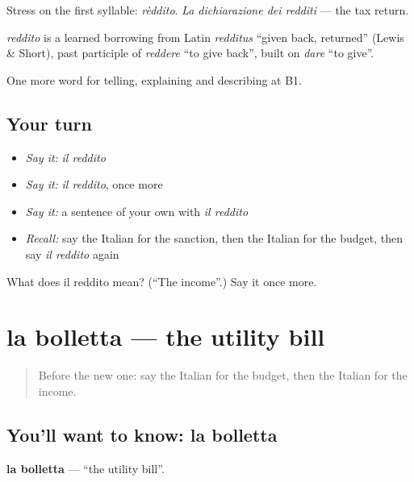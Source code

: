 Stress on the first syllable: \emph{rèddito}. \emph{La dichiarazione dei redditi} — the tax return.

\begin{cousinweb}
\emph{reddito} is a learned borrowing from Latin \emph{redditus} \textquotedblleft{}given back, returned\textquotedblright{} (Lewis \& Short), past participle of \emph{reddere} \textquotedblleft{}to give back\textquotedblright{}, built on \emph{dare} \textquotedblleft{}to give\textquotedblright{}.
\end{cousinweb}

\begin{grammarlens}[title={What you've built}]
One more word for telling, explaining and describing at B1.
\end{grammarlens}

\subsection*{Your turn}
\begin{itemize}
\raggedright
  \item \emph{Say it:} \emph{il reddito}
  \item \emph{Say it:} \emph{il reddito}, once more
  \item \emph{Say it:} a sentence of your own with \emph{il reddito}
  \item \emph{Recall:} say the Italian for the sanction, then the Italian for the budget, then say \emph{il reddito} again
\end{itemize}

\begin{tcolorbox}[breakable,colback=teal!4,colframe=teal!35!black,title={Before you move on}]
What does il reddito mean? (\textquotedblleft{}The income\textquotedblright{}.) Say it once more.
\end{tcolorbox}
\section[la bolletta]{la bolletta — the utility bill}

\label{lesson:IT-C394-bolletta}



\begin{quote}
Before the new one: say the Italian for the budget, then the Italian for the income.
\end{quote}

\subsection*{You'll want to know: la bolletta}
\textbf{la bolletta} — \textquotedblleft{}the utility bill\textquotedblright{}.

